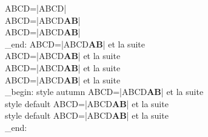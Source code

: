%

ABCD=\CDRCode|ABCD|\\
ABCD=\CDRCode|ABCD\textbf{AB}|\\
ABCD=\CDRCode[fontfamily=menlo]|ABCD\textbf{AB}|\\

\group_end:
\ExplSyntaxOff
{}
ABCD=\CDRCode|ABCD\textbf{AB}| et la suite\\
ABCD=\CDRCode[style=autumn]|ABCD\textbf{AB}| et la suite\\
ABCD=\CDRCode[cache=true]|ABCD\textbf{AB}| et la suite\\
ABCD=\CDRCode[cache=true,debug=true]|ABCD\textbf{AB}| et la suite\\
\ExplSyntaxOn
\group_begin:
\ExplSyntaxOff
{}
style autumn  ABCD=\CDRCode[tag=X]|ABCD\textbf{AB}| et la suite\\
style default ABCD=\CDRCode[tag=Y]|ABCD\textbf{AB}| et la suite\\
style default ABCD=\CDRCode[engine=efbox, efbox engine options={hidealllines,backgroundcolor=red}, engine options={backgroundcolor=yellow}]|ABCD\textbf{AB}| et la suite\\
\ExplSyntaxOn
\group_end:
\ExplSyntaxOff
{}
